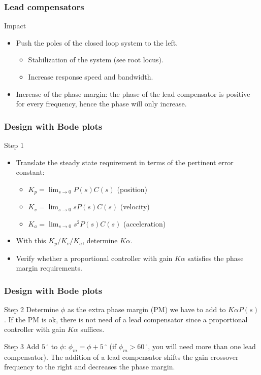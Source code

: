 \begin{frame}
\frametitle{Lead compensators}
\begin{block}{Impact}
	\begin{itemize}
	\item Push the poles of the closed loop system to the left.
	\begin{itemize}
	\item Stabilization of the system (see root locus).
	\item Increase response speed and bandwidth.
	\end{itemize}
	\item Increase of the phase margin: the phase of the lead compensator is positive for every frequency, hence the phase will only increase.
	\end{itemize}
\end{block}
\end{frame}

\begin{frame}
	\frametitle{Design with Bode plots}
	\begin{block}{Step 1}
		\begin{itemize}
			\item Translate the steady state requirement in terms of the pertinent error constant:
			\begin{itemize}
				\item $K_p = \lim_{s \to 0} P(s)C(s)$ (position)
				\item $K_v = \lim_{s \to 0} sP(s)C(s)$ (velocity)
				\item $K_a = \lim_{s \to 0} s^2P(s)C(s)$ (acceleration)
			\end{itemize}
			\item With this $K_p/K_v/K_a$, determine $K\alpha$.
			\item Verify whether a proportional controller with gain $K\alpha$ satisfies the phase margin requirements.
		\end{itemize}
	\end{block}
\end{frame}

\begin{frame}
	\frametitle{Design with Bode plots}
	\begin{block}{Step 2}
		Determine $\phi$ as the extra phase margin (PM) we have to add to  $K\alpha P(s)$. If the PM is ok, there is not need of a lead compensator since a proportional controller with gain $K\alpha$ suffices.
	\end{block}
	\begin{block}{Step 3}
		Add $5\,^{\circ}$ to $\phi$: $\phi_m = \phi + 5\,^{\circ}$ (if $\phi_m > 60\,^{\circ}$, you will need more than one lead compensator). The addition of a lead compensator shifts the gain crossover frequency to the right and decreases the
		phase margin.
	\end{block}
\end{frame}


